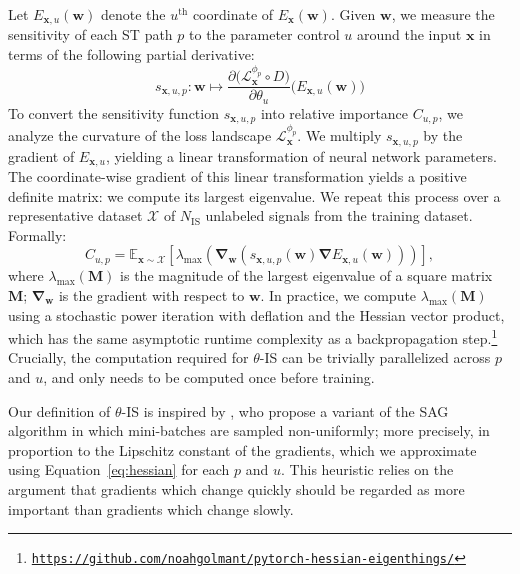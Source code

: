 \documentclass{article} %
\theoremstyle{plain}
\theoremstyle{definition}
\theoremstyle{remark}
\begin{document}
Let $E_{\boldsymbol{x},u}(\boldsymbol{w})$ denote the $u^{\mathrm{th}}$ coordinate of $E_{\boldsymbol{x}}(\boldsymbol{w})$. 
Given $\boldsymbol{w}$, we measure the sensitivity of each ST path $p$ to the parameter control $u$ around the input $\boldsymbol{x}$ in terms of the following partial derivative:
\begin{equation}
s_{\boldsymbol{x},u,p} : \boldsymbol{w} \longmapsto\dfrac{\partial \big(\mathcal{L}_{\boldsymbol{x}}^{\phi_p}\circ D\big)}{\partial \theta_u}
\Big(E_{\boldsymbol{x},u}(\boldsymbol{w})\Big)
\end{equation}
To convert the sensitivity function $s_{\boldsymbol{x},u,p}$ into relative importance $C_{u,p}$, we analyze the curvature of the loss landscape $\mathcal{L}_{\boldsymbol{x}}^{\phi_p}$. 
We multiply $s_{\boldsymbol{x},u,p}$ by the gradient of $E_{\boldsymbol{x},u}$, yielding a linear transformation of neural network parameters.
The coordinate-wise gradient of this linear transformation yields a positive definite matrix: we compute its largest eigenvalue. 
We repeat this process over a representative dataset $\mathcal{X}$ of $N_{\mathrm{IS}}$ unlabeled signals from the training dataset.
Formally:
\begin{equation}
\label{eq:hessian}
C_{u,p} =
\mathbb{E}_{\boldsymbol{x}\sim\mathcal{X}}\left[
\lambda_{\max}\left(
\boldsymbol{\nabla}_{\!\boldsymbol{w}}
\left(
s_{\boldsymbol{x},u,p}(\boldsymbol{w})
\boldsymbol{\nabla}E_{\boldsymbol{x},u}(\boldsymbol{w})%
\right)
\right)
\right],
\end{equation}
where $\lambda_{\max}(\mathbf{M})$ is the magnitude of the largest eigenvalue of a square matrix $\mathbf{M}$; $\boldsymbol{\nabla}_{\boldsymbol{w}}$ is the gradient with respect to $\boldsymbol{w}$.
In practice, we compute $\lambda_{\max}(\mathbf{M})$ using a stochastic power iteration with deflation and the Hessian vector product, which has the same asymptotic runtime complexity as a backpropagation step.\footnote{\texttt{\url{https://github.com/noahgolmant/pytorch-hessian-eigenthings/}}}
Crucially, the computation required for $\theta$-IS can be trivially parallelized across $p$ and $u$, and only needs to be computed once before training.

Our definition of $\theta$-IS is inspired by \cite{schmidt2017minimizing}, who propose a variant of the SAG algorithm in which mini-batches are sampled non-uniformly; more precisely, in proportion to the Lipschitz constant of the gradients, which we approximate using Equation~\ref{eq:hessian} for each $p$ and $u$.
This heuristic relies on the argument that gradients which change quickly should be regarded as more important than gradients which change slowly.
\end{document}
